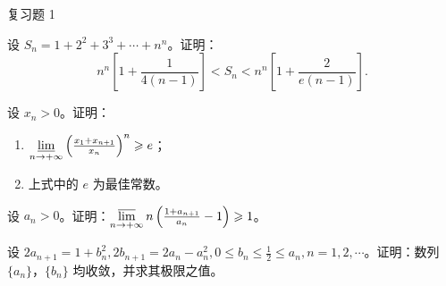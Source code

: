 \begin{exblock}{复习题 1}
    \item 设 $S_n = 1 + 2^2 + 3^3 + \cdots + n^n$。证明：
    \[
    n^n \left[1 + \frac{1}{4(n-1)}\right] < S_n < n^n \left[1 + \frac{2}{e(n-1)}\right].
\]

    \item 设 $x_n > 0$。证明：
    \begin{enumerate}
        \item $\varliminf\limits_{n\to+\infty} \left(\frac{x_1 + x_{n+1}}{x_n}\right)^n \geqslant e$；
        \item 上式中的 $e$ 为最佳常数。
    \end{enumerate}

    \item 设 $a_n > 0$。证明：$\varlimsup\limits_{n\to+\infty} n \left(\frac{1 + a_{n+1}}{a_n} - 1\right) \geqslant 1$。

    \item 设 $2a_{n+1} = 1 + b_n^2, 2b_{n+1} = 2a_n - a_n^2, 0 \leqslant b_n \leqslant \frac{1}{2} \leqslant a_n, n = 1, 2, \cdots$。证明：数列 $\{a_n\}$，$\{b_n\}$ 均收敛，并求其极限之值。
\end{exblock}
